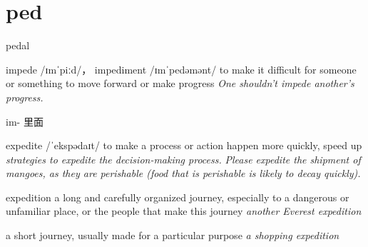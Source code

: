 \chapter{ped}

\begin{word}{pedal}
\end{word}

\begin{word}{impede /ɪmˈpiːd/， impediment /ɪmˈpedəmənt/ } 
    to make it difficult for someone or something to move forward or make progress
    \textit{One shouldn't impede another's progress.}

    im- 里面
\end{word}

\begin{word}{expedite /ˈekspədaɪt/}
    to make a process or action happen more quickly, speed up
    \textit{strategies to expedite the decision-making process.}
    \textit{Please expedite the shipment of mangoes, as they are perishable (food that is perishable is likely to decay quickly).}
\end{word}

\begin{word}{expedition}
    a long and carefully organized journey, especially to a dangerous or unfamiliar place, or the people that make this journey
    \textit{another Everest expedition}

    a short journey, usually made for a particular purpose
    \textit{a shopping expedition}
\end{word}
